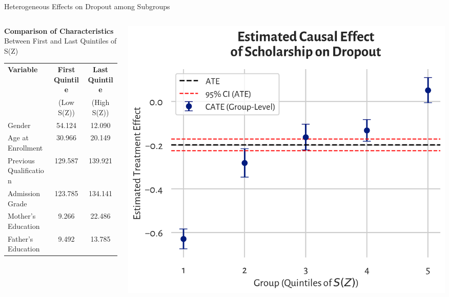 \documentclass[aspectratio=169]{beamer}
\begin{document}
\begin{frame}{Heterogeneous Effects on Dropout among Subgroups}
\vspace{10pt}
\begin{columns}
\begin{column}{0.5\textwidth}
\small
\textbf{Comparison of Characteristics} \\ Between First and Last Quintiles of S(Z) \\
\vspace{5pt}
\begin{tabular}{l c c}
    \hline
    \textbf{Variable} & \textbf{First Quintile} & \textbf{Last Quintile} \\ & (Low S(Z)) & (High S(Z)) \\
    \hline
    Gender & 54.124 & 12.090 \\
    Age at Enrollment & 30.966 & 20.149 \\
    Previous Qualification & 129.587 & 139.921 \\
    Admission Grade & 123.785 & 134.141 \\
    Mother’s Education & 9.266 & 22.486 \\
    Father’s Education & 9.492 & 13.785 \\
    \hline
\end{tabular}
\end{column}
\begin{column}{0.4\textwidth}
\hspace*{-0.1cm}
	\includegraphics[width=1.1\linewidth]{Tex_Pictures/HE_quintile_dropout.png}
\end{column}
\end{columns}


\end{frame}
\end{document}
